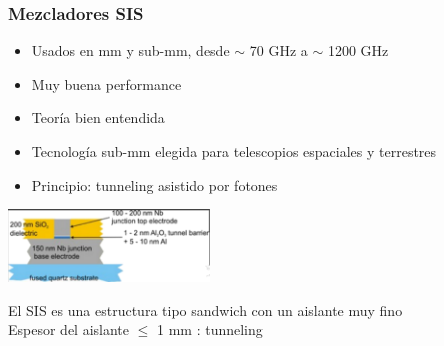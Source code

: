 \documentclass{beamer}
\begin{document}
\begin{frame}
				\frametitle{Mezcladores SIS}
				\begin{itemize}
								\item Usados en mm y sub-mm, desde $\sim$ 70 GHz a $\sim$ 1200
												GHz
								\item Muy buena performance
								\item Teoría bien entendida
								\item Tecnología sub-mm elegida para telescopios espaciales y
												terrestres
								\item \alert{Principio: tunneling asistido por fotones}
				\end{itemize}
								\begin{center}
												\includegraphics[height=0.3\textheight,width=0.4\textwidth]{sis_mixer}
								\end{center}
								El SIS es una estructura tipo sandwich con un aislante muy
								fino\\
								\alert{Espesor del aislante $\leq$ 1 mm : tunneling}
\end{frame} 
\end{document}
